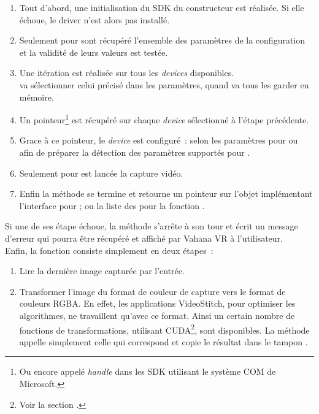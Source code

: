 \begin{enumerate}
  \item Tout d'abord, une initialisation du SDK du constructeur est réalisée. Si
  elle échoue, le driver n'est alors pas installé.
  \item Seulement pour  sont récupéré l'ensemble des paramètres
  de la configuration et la validité de leurs valeurs est testée.
  \item Une itération est réalisée sur tous les \textit{devices} disponibles.\\
   va sélectionner celui précisé dans les paramètres, quand 
  va tous les garder en mémoire.
  \item Un pointeur\footnote{Ou encore appelé \textit{handle} dans les SDK utilisant 
  le système COM de Microsoft.} est récupéré sur chaque \textit{device} sélectionné
  à l'étape précédente.
  \item Grace à ce pointeur, le \textit{device} est configuré~: selon les paramètres
  pour  ou afin de préparer la détection des paramètres supportés pour
  .
  \item Seulement pour  est lancée la capture vidéo.
  \item Enfin la méthode se termine et retourne un pointeur sur l'objet implémentant
  l'interface  pour ; ou la liste des 
  pour la fonction .
\end{enumerate}
Si une de ses étape échoue, la méthode s'arrête à son tour et écrit un message d'erreur
qui pourra être récupéré et affiché par Vahana VR à l'utilisateur.\\
\newline
Enfin, la fonction  consiste simplement en deux étapes~:
\begin{enumerate}
  \item Lire la dernière image capturée par l'entrée.
  \item Transformer l'image du format de couleur de capture vers le format de couleurs
  RGBA. En effet, les applications VideoStitch, pour optimiser les algorithmes,
  ne travaillent qu'avec ce format. Ainsi un certain nombre de fonctions de transformations, utilisant
  CUDA\footnote{Voir la section .}, sont disponibles.
  La méthode appelle simplement celle qui correspond et copie le résultat dans le
  tampon .
\end{enumerate}

